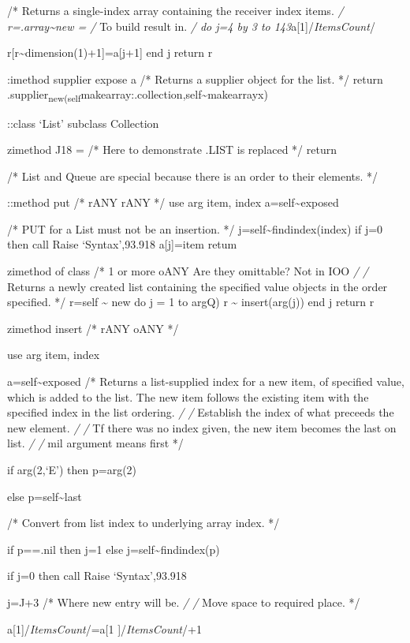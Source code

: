 /* Returns a single-index array containing the receiver index items.
\emph{/ r=.array\textasciitilde new = /} To build result in. \emph{/ do
j=4 by 3 to 143}a{[}1{]}/\emph{ItemsCount}/

r{[}r\textasciitilde dimension(1)+1{]}=a{[}j+1{]} end j return r

:imethod supplier expose a /* Returns a supplier object for the list. */
return
.supplier\textsubscript{new(self}makearray:.collection,self\textasciitilde makearrayx)

::class `List' subclass Collection

zimethod J18 = /* Here to demonstrate .LIST is replaced */ return

/* List and Queue are special because there is an order to their
elements. */

::method put /* rANY rANY */ use arg item, index
a=self\textasciitilde exposed

/* PUT for a List must not be an insertion. */
j=self\textasciitilde findindex(index) if j=0 then call Raise
`Syntax',93.918 a{[}j{]}=item retum

zimethod of class /* 1 or more oANY Are they omittable? Not in IOO
\emph{/ /} Returns a newly created list containing the specified value
objects in the order specified. */ r=self \textasciitilde{} new do j = 1
to argQ) r \textasciitilde{} insert(arg(j)) end j return r

zimethod insert /* rANY oANY */

use arg item, index

a=self\textasciitilde exposed /* Returns a list-supplied index for a new
item, of specified value, which is added to the list. The new item
follows the existing item with the specified index in the list ordering.
\emph{/ /} Establish the index of what preceeds the new element. \emph{/
/} Tf there was no index given, the new item becomes the last on list.
\emph{/ /} mil argument means first */

if arg(2,`E') then p=arg(2)

else p=self\textasciitilde last

/* Convert from list index to underlying array index. */

if p==.nil then j=1 else j=self\textasciitilde findindex(p)

if j=0 then call Raise `Syntax',93.918

j=J+3 /* Where new entry will be. \emph{/ /} Move space to required
place. */

a{[}1{]}/\emph{ItemsCount}/=a{[}1 {]}/\emph{ItemsCount}/+1

